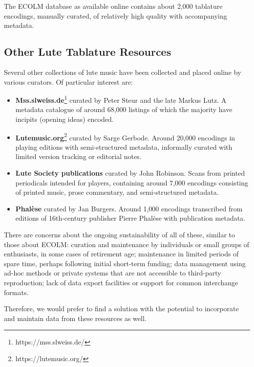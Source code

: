 \documentclass[sigconf, nonacm=true]{acmart}
\begin{document}
\begin{sloppypar}
  The ECOLM database as available online contains about 2,000
  tablature encodings, manually curated, of relatively high quality
  with accompanying metadata.

  \subsection{Other Lute Tablature Resources}

  Several other collections of lute music have been collected and
  placed online by various curators. Of particular interest are:
  \begin{itemize}
    \item {\bf Mss.slweiss.de}\footnote{https://mss.slweiss.de/}
      curated by Peter Steur and the late Markus Lutz. A metadata
      catalogue of around 68,000 listings of which the majority have
      incipits (opening ideas) encoded.
    \item {\bf Lutemusic.org}\footnote{https://lutemusic.org/} curated
      by Sarge Gerbode. Around 20,000 encodings in playing editions
      with semi-structured metadata, informally curated with limited
      version tracking or editorial notes.
    \item {\bf Lute Society publications} curated by John
      Robinson. Scans from printed periodicals intended for players,
      containing around 7,000 encodings consisting of printed music,
      prose commentary, and semi-structured metadata.
    \item {\bf Phal\`ese} curated by Jan Burgers. Around 1,000
      encodings transcribed from editions of 16th-century publisher
      Pierre Phal\`ese with publication metadata.

  \end{itemize}

  There are concerns about the ongoing sustainability of all of these,
  similar to those about ECOLM: curation and maintenance by
  individuals or small groups of enthusiasts, in some cases of
  retirement age; maintenance in limited periods of spare time,
  perhaps following initial short-term funding; data management using
  ad-hoc methods or private systems that are not accessible to
  third-party reproduction; lack of data export facilities or support
  for common interchange formats.

  Therefore, we would prefer to find a solution with the potential to
  incorporate and maintain data from these resources as well.


\end{sloppypar}
\end{document}
